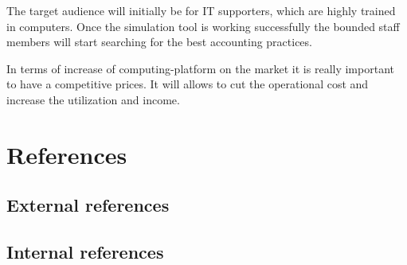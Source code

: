 	The target audience will initially be for IT supporters, which are highly trained in computers. Once the simulation tool is working successfully the bounded staff members will start searching for the best accounting practices.
	
	In terms of increase of \gls{computing-platform} on the market it is really important to have a competitive prices. It will allows to cut the operational cost and increase the utilization and income.
\section{References} \label{s:introduction:references}
	\begin{comment}
		$<$List all of the applicable reference documents. The references are separated into “external” references
		that are imposed external to the project and “internal” references that are imposed from within to the
		project. This may also be at the end of the document.$>$
	\end{comment}
	
\subsection*{External references} \label{s:introduction:external-references}
	\begin{comment}
		$<$List references to the relevant policies or laws that give rise to the need for this plan, e.g.		
		\begin{enumerate}
		\item Laws
		\item Government regulations
		\item Standards (e.g., governmental and/or consensus)
		\item IEEE Std. 829-2008 - IEEE Standard for Software and System Test Documentation.
		IEEE Computer Society, 2008.
		\item Policies
		\end{enumerate}
		The reference to this standard includes how and if it has been tailored for this project, an overview of
		the level(s) of documentation expected, and their contents (or a reference to an organizational standard
		or document that delineates the expected test documentation details).$>$
	\end{comment}


\subsection*{Internal references} \label{s:introduction:internal-references}
	\begin{comment}
		$<$ List references to documents such as other plans or task descriptions that supplement this plan, e.g.:
		\begin{enumerate}
		\item Project authorization
		\item Project plan (or project management plan)
		\item Quality assurance plan
		\item Configuration management plan
		\end{enumerate}
		$>$
	\end{comment}

